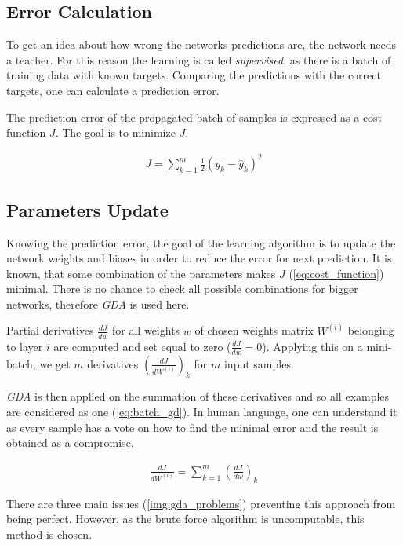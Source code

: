 \subsection{Error Calculation} \label{ssec:error_calculation}
To get an idea about how wrong the networks predictions are, the network needs a teacher. For this reason the learning is called \textit{supervised}, as there is a batch of training data with known targets. Comparing the predictions with the correct targets, one can calculate a prediction error. 

The prediction error of the propagated batch of samples is expressed as a cost function $ J $. The goal is to minimize $ J $.

\begin{align} \label{eq:cost_function}
J = \displaystyle{\sum_{k=1}^m} \frac{1}{2}(y_k - \hat{y}_k)^2
\end{align}

\subsection{Parameters Update} \label{ssec:parameters_update}
Knowing the prediction error, the goal of the learning algorithm is to update the network weights and biases in order to reduce the error for next prediction.  It is known, that some combination of the parameters makes $ J $ (\cref{eq:cost_function}) minimal. There is no chance to check all possible combinations for bigger networks, therefore \textit{GDA} is used here.

Partial derivatives $ \frac{dJ}{dw} $ for all weights $ w $ of chosen weights matrix $ W^{(i)} $ belonging to layer $ i $ are computed and set equal to zero ($ \frac{dJ}{dw} = 0 $). Applying this on a mini-batch, we get $ m $ derivatives $ (\frac{dJ}{dW^{(i)}})_k $ for $ m $ input samples. 

\textit{GDA} is then applied on the summation of these derivatives and so all examples are considered as one (\cref{eq:batch_gd}). In human language, one can understand it as every sample has a vote on how to find the minimal error and the result is obtained as a compromise.

\begin{align} \label{eq:batch_gd}
\frac{dJ}{dW^{(i)}} =  \displaystyle{\sum_{k=1}^m} (\frac{dJ}{dw})_k
\end{align}

There are three main issues (\cref{img:gda_problems}) preventing this approach from being perfect. However, as the brute force algorithm is uncomputable, this method is chosen.

